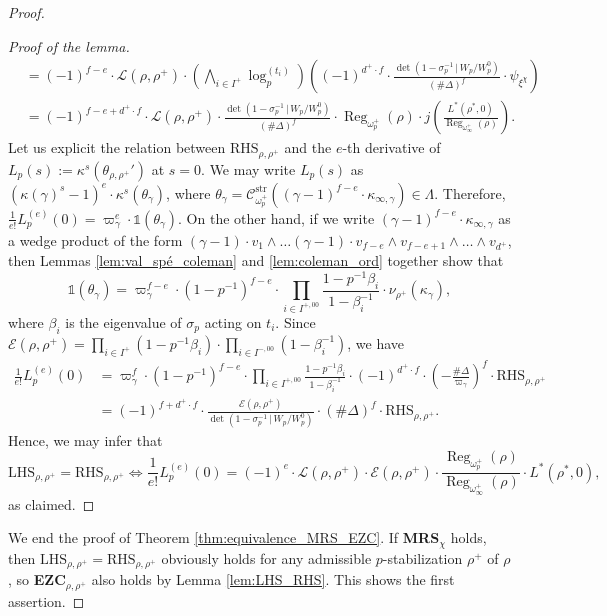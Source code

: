 \documentclass[12pt]{amsart}
\newcommand\cE{\mathcal{E}}
\newcommand\cL{\mathcal{L}}
\newcommand\sC{\mathscr{C}}
\newcommand{\str}{\mathrm{str}}
\DeclareMathOperator{\Reg}{Reg}
\theoremstyle{defstyle}
\theoremstyle{thmstyle}
\begin{document}
\begin{proof}
\begin{proof}[Proof of the lemma]
\begin{align*}
	&=(-1)^{f-e}\cdot \cL(\rho,{\rho}^+)\cdot \left(\bigwedge_{i\in I^+} \log_p^{(t_i)}\right)\left((-1)^{d^+\cdot f}\cdot  \frac{\det(1-\sigma_p^{-1}\,\big| \, W_p/W_p^0)}{(\#\Delta)^f}\cdot \psi_{\xi^\chi}\right) \\
	&=(-1)^{f-e+d^+\cdot f}\cdot \cL(\rho,{\rho}^+)\cdot \frac{\det(1-\sigma_p^{-1}\,\big| \, W_p/W_p^0)}{(\#\Delta)^f} \cdot \Reg_{{\omega}^+_{p}}(\rho) \cdot j\left(\frac{L^*(\rho^*,0)}{\Reg_{\omega_{\infty}^+}(\rho)}\right).
	\end{align*}
	Let us explicit the relation between $\textrm{RHS}_{\rho,\rho^+}$ and the $e$-th derivative of $L_p(s):=\kappa^s(\theta_{\rho,\rho^+}')$ at $s=0$. We may write $L_p(s)$ as $(\kappa(\gamma)^s-1)^e\cdot \kappa^s(\theta_\gamma)$, where $\theta_\gamma = \sC^\str_{{\omega}_p^+}((\gamma-1)^{f-e}\cdot \kappa_{\infty,\gamma})\in\Lambda$. Therefore, $\frac{1}{e!}L_p^{(e)}(0)=\varpi_\gamma^e \cdot \mathds{1}(\theta_\gamma)$. On the other hand, if we write $(\gamma-1)^{f-e}\cdot \kappa_{\infty,\gamma}$ as a wedge product of the form $(\gamma-1)\cdot v_1 \wedge \ldots (\gamma-1)\cdot v_{f-e} \wedge v_{f-e+1} \wedge \ldots \wedge v_{d^+}$, then Lemmas \ref{lem:val_spé_coleman} and \ref{lem:coleman_ord} together show that
	$$\mathds{1}(\theta_\gamma)=\varpi_\gamma^{f-e} \cdot(1-p^{-1})^{f-e}\cdot \prod_{i\in I^{+,00}}\frac{1-p^{-1}\beta_i}{1-\beta_i^{-1}} \cdot \nu_{\rho^+}(\kappa_\gamma),$$
	where $\beta_i$ is the eigenvalue of $\sigma_p$ acting on $t_i$. Since $\cE(\rho,{\rho}^+) = \prod_{i\in I^+}(1-p^{-1}\beta_i) \cdot \prod_{i\in I^{-,00}}(1-\beta_i^{-1})$, we have
	\begin{align*}
	\frac{1}{e!} L_p^{(e)}(0) &= \varpi_\gamma^{f} \cdot(1-p^{-1})^{f-e}\cdot \prod_{i\in I^{+,00}}\frac{1-p^{-1}\beta_i}{1-\beta_i^{-1}} \cdot (-1)^{d^+\cdot f}\cdot \left(-\frac{\#\Delta}{\varpi_\gamma}\right)^f \cdot \textrm{RHS}_{\rho,\rho^+} \\
	&=(-1)^{f+d^+\cdot f}\cdot \frac{\cE(\rho,{\rho}^+)}{\det(1-\sigma_p^{-1}\, \big|\, W_p/W_p^0)} \cdot (\#\Delta)^f \cdot \textrm{RHS}_{\rho,\rho^+}.
	\end{align*}
	Hence, we may infer that 
	$$ \textrm{LHS}_{\rho,\rho^+}=\textrm{RHS}_{\rho,\rho^+} \Longleftrightarrow \frac{1}{e!} L_p^{(e)}(0)= (-1)^e \cdot \cL(\rho,{\rho}^+)\cdot \cE(\rho,{\rho}^+)\cdot  \frac{\Reg_{{\omega}^+_{p}}(\rho)}{\Reg_{\omega_{\infty}^+}(\rho)}\cdot L^*(\rho^*,0),$$
	as claimed. \end{proof}
	 We end the proof of Theorem \ref{thm:equivalence_MRS_EZC}. If \textbf{MRS}$_\chi$ holds, then $\textrm{LHS}_{\rho,\rho^+}=\textrm{RHS}_{\rho,\rho^+}$ obviously holds for any admissible $p$-stabilization $\rho^+$ of $\rho$, so \textbf{EZC}$_{\rho,\rho^+}$ also holds by Lemma \ref{lem:LHS_RHS}. This shows the first assertion. 
	 

\end{proof}
\end{document}
